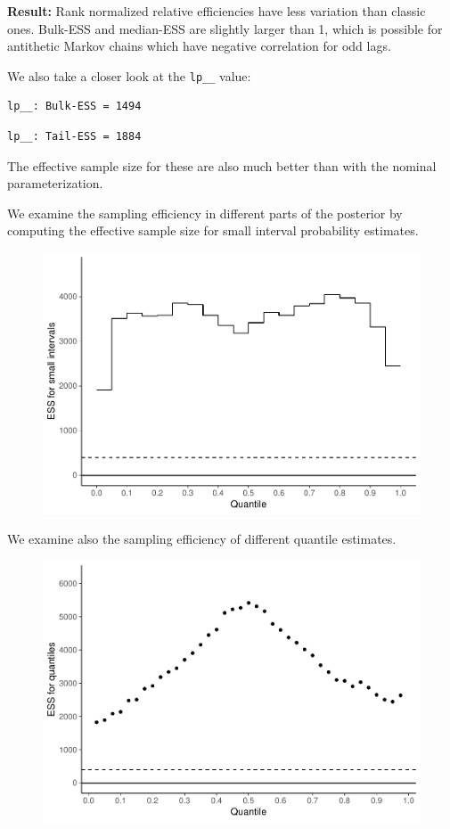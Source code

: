 \documentclass[american,]{article}
\begin{document}
\textbf{Result:} Rank normalized relative efficiencies have less
variation than classic ones. Bulk-ESS and median-ESS are slightly larger
than 1, which is possible for antithetic Markov chains which have
negative correlation for odd lags.

We also take a closer look at the \texttt{lp\_\_} value:

\begin{verbatim}
lp__: Bulk-ESS = 1494
\end{verbatim}

\begin{verbatim}
lp__: Tail-ESS = 1884
\end{verbatim}

The effective sample size for these are also much better than with the
nominal parameterization.

We examine the sampling efficiency in different parts of the posterior
by computing the effective sample size for small interval probability
estimates.

\begin{figure}[t]
  \centering
  \includegraphics[width=0.6\linewidth]{graphics/local-ess-fit-alt3-1.pdf}
\end{figure}

We examine also the sampling efficiency of different quantile estimates.

\begin{figure}[t]
  \centering
  \includegraphics[width=0.6\linewidth]{graphics/quantile-ess-fit-alt3-1.pdf}
\end{figure}
\end{document}
